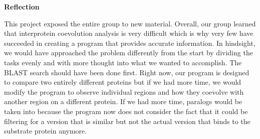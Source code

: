\documentclass[11pt]{article}
\begin{document}
\newpage

\begin{center}
\textbf{Reflection}
\end{center}

This project exposed the entire group to new material. Overall, our group learned that interprotein coevolution analysis is very difficult which is why very few have succeeded in creating a program that provides accurate information. In hindsight, we would have approached the problem differently from the start by dividing the tasks evenly and with more thought into what we wanted to accomplish. The BLAST search should have been done first. Right now, our program is designed to compare two entirely different proteins but if we had more time, we would modify the program to observe individual regions and how they coevolve with another region on a different protein.  If we had more time, paralogs would be taken into because the program now does not consider the fact that it could be filtering for a version that is similar but not the actual version that binds to the substrate protein anymore.
\end{document}
